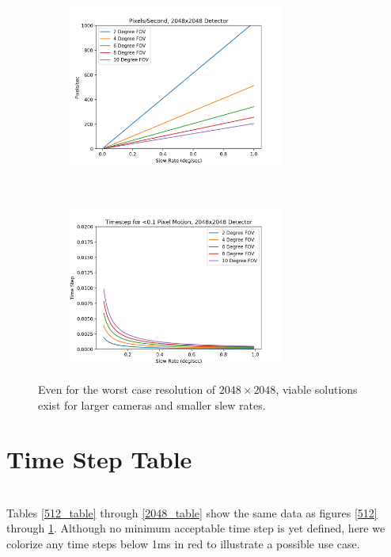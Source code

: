 \documentclass[]{DINOReportMemo}
\begin{document}
\begin{figure}[t!]
    \centering
    \begin{subfigure}
        \centering
        \includegraphics[height=2.1in]{2048x2048_pix_per_sec}
    \end{subfigure}%
    ~ 
    \begin{subfigure}
        \centering
        \includegraphics[height=2.1in]{2048x2048_min_dt}
    \end{subfigure}
    \caption{Even for the worst case resolution of $2048\times2048$, viable solutions exist for larger cameras and smaller slew rates.}
    \label{2048}
\end{figure}

\section{Time Step Table}\\
Tables \ref{512_table} through \ref{2048_table} show the same data as figures \ref{512} through \ref{2048}. Although no minimum acceptable time step is yet defined, here we colorize any time steps below 1ms in red to illustrate a possible use case.
\end{document}
